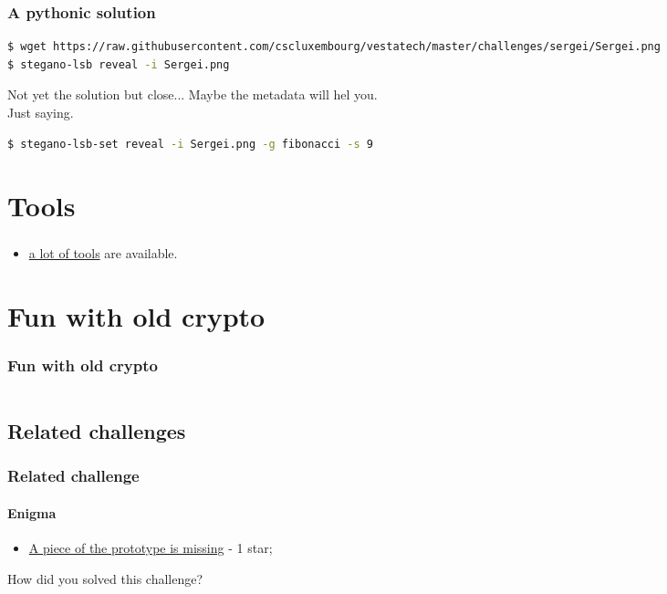 \documentclass[]{beamer}
\begin{document}
\begin{frame}[fragile]
\frametitle{A pythonic solution}
\begin{lstlisting}[language=Bash]
$ wget https://raw.githubusercontent.com/cscluxembourg/vestatech/master/challenges/sergei/Sergei.png
$ stegano-lsb reveal -i Sergei.png
\end{lstlisting}
Not yet the solution but close... Maybe the metadata will hel you.\\Just saying.
\bigskip

\begin{lstlisting}[language=Bash]
$ stegano-lsb-set reveal -i Sergei.png -g fibonacci -s 9
\end{lstlisting}
\end{frame}

\section{Tools}
\begin{frame}
\frametitle{}
\begin{itemize}
    \item \href{https://github.com/topics/steganography}{a lot of tools} are available.
\end{itemize}
\end{frame}



%
%
\section{Fun with old crypto}
\begin{frame}
    \frametitle{Fun with old crypto}
    \begin{columns}[t]
        \begin{column}{5cm}
            \tableofcontents[sections={1-3}, currentsection, hideothersubsections]
        \end{column}
        \begin{column}{5cm}
            \tableofcontents[sections={4-5}, currentsection, hideothersubsections]
        \end{column}
    \end{columns}
\end{frame}
\subsection{Related challenges}
\begin{frame}
\frametitle{Related challenge}
\framesubtitle{Enigma}
\begin{itemize}
    \item \href{https://github.com/cscluxembourg/vestatech/tree/master/challenges/the-missing-piece}{A piece of the prototype is missing} - 1 star;
\end{itemize}
\bigskip
How did you solved this challenge?
\end{frame}
\end{document}
